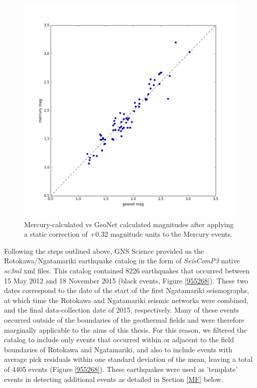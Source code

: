 \begin{figure}[h!]
\begin{center}
\includegraphics[width=0.70\columnwidth]{Chapter_2_Data/figures/geonet-merc_mag_comp/geonet-merc_mag_comp}
\caption[Mercury vs. GeoNet magnitude relationship]{{
Mercury-calculated vs GeoNet calculated magnitudes after applying a
static correction of +0.32 magnitude units to the Mercury events.
{\label{910533}}%
}}
\end{center}
\end{figure}

Following the steps outlined above, GNS Science provided us the Rotokawa\slash{Ngatamariki} earthquake catalog in the form of \textit{SeisComP3} native \textit{sc3ml} xml files. This catalog contained 8226 earthquakes that occurred between 15 May 2012 and 18 November 2015 (black events, Figure \ref{955268}). These two dates correspond to the date of the start of the first Ngatamariki seismographs, at which time the Rotokawa and Ngatamariki seismic networks were combined, and the final data-collection date of 2015, respectively. Many of these events occurred outside of the boundaries of the geothermal fields and were therefore marginally applicable to the aims of this thesis. For this reason, we filtered the catalog to include only events that occurred within or adjacent to the field boundaries of Rotokawa and Ngatamariki, and also to include events with average pick residuals within one standard deviation of the mean, leaving a total of 4405 events (Figure \ref{955268}). These earthquakes were used as 'template' events in detecting additional events as detailed in Section \ref{MF} below.

